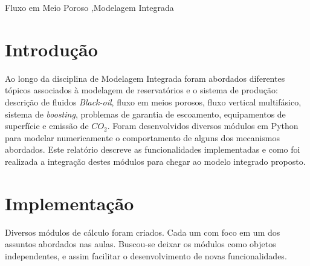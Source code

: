 \documentclass[final,5p]{elsarticle}
\numberwithin{equation}{section}
\begin{document}
\begin{frontmatter}
\begin{abstract}
\end{abstract}




\begin{keyword}
    Fluxo em Meio Poroso \sep Modelagem Integrada



\end{keyword}

\end{frontmatter}


\section{Introdução}

    Ao longo da disciplina de Modelagem Integrada foram abordados diferentes tópicos associados à modelagem de reservatórios e o sistema de produção: descrição de fluidos \emph{Black-oil}, fluxo em meios porosos, fluxo vertical multifásico, sistema de \emph{boosting}, problemas de garantia de escoamento, equipamentos de superfície e emissão de $CO_2$.
    Foram desenvolvidos diversos módulos em Python para modelar numericamente o comportamento de alguns dos mecanismos abordados. Este relatório descreve as funcionalidades implementadas e como foi realizada a integração destes módulos para chegar ao modelo integrado proposto.

\section{Implementação}

    Diversos módulos de cálculo foram criados. Cada um com foco em um dos assuntos abordados nas aulas. Buscou-se deixar os módulos como objetos independentes, e assim facilitar o desenvolvimento de novas funcionalidades.
\end{document}
